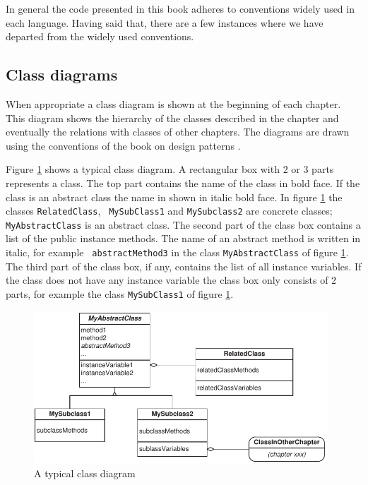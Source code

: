 \documentclass[twoside]{book}
\begin{document}
In general the code presented in this book adheres to conventions
widely used in each language. Having said that, there are a few
instances where we have departed from the widely used conventions.

\subsection{Class diagrams}
When appropriate a class diagram is shown at the beginning of each
chapter. This diagram shows the hierarchy of the classes described
in the chapter and eventually the relations with classes of other
chapters. The diagrams are drawn using the conventions of the book
on design patterns \cite{GoF}.

Figure \ref{fig:classDiagram} shows a typical class diagram. A
rectangular box with 2 or 3 parts represents a class. The top part
contains the name of the class in bold face. If the class is an
abstract class the name in shown in italic bold face. In figure
\ref{fig:classDiagram} the classes {\tt RelatedClass}, {\tt
MySubClass1} and {\tt MySubclass2} are concrete classes; {\tt
MyAbstractClass} is an abstract class. The second part of the
class box contains a list of the public instance methods. The name
of an abstract method is written in italic, for example {\tt
abstractMethod3} in the class {\tt MyAbstractClass} of figure
\ref{fig:classDiagram}. The third part of the class box, if any,
contains the list of all instance variables. If the class does not
have any instance variable the class box only consists of 2 parts,
for example the class {\tt MySubClass1} of figure
\ref{fig:classDiagram}.
\begin{figure}
\centering\includegraphics[width=11cm]{Figures/TypicalClassDiagram}
\caption{A typical class diagram} \label{fig:classDiagram}
\end{figure}
\end{document}
